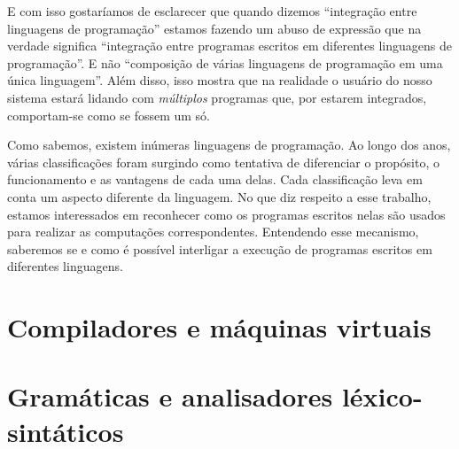 
  E com isso gostaríamos de esclarecer que quando dizemos ``integração entre
  linguagens de programação'' estamos fazendo um abuso de expressão que na
  verdade significa ``integração entre programas escritos em diferentes
  linguagens de programação''. E não ``composição de várias linguagens de
  programação em uma única linguagem''. Além disso, isso mostra que na realidade
  o usuário do nosso sistema estará lidando com \emph{múltiplos} programas que,
  por estarem integrados, comportam-se como se fossem um só.

  Como sabemos, existem inúmeras linguagens de programação. Ao longo dos anos,
  várias classificações foram surgindo como tentativa de diferenciar o
  propósito, o funcionamento e as vantagens de cada uma delas. Cada
  classificação leva em conta um aspecto diferente da linguagem. No que diz
  respeito a esse trabalho, estamos interessados em reconhecer como os programas
  escritos nelas são usados para realizar as computações correspondentes.
  Entendendo esse mecanismo, saberemos se e como é possível interligar a
  execução de programas escritos em diferentes linguagens.

  \section{Compiladores e máquinas virtuais}
  \label{cap:conceitos:compiladores}


  \section{Gramáticas e analisadores léxico-sintáticos}
  \label{cap:conceitos:gramaticas}

